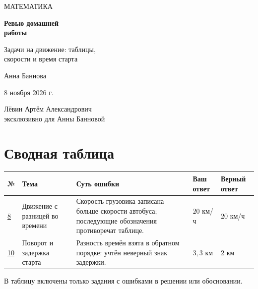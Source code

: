 \documentclass[a4paper,12pt]{article}
\begin{document}
\begin{titlepage}
\centering
\vspace*{21mm}
{\large\color{muted} МАТЕМАТИКА\par}
\vspace{20mm}
{\Huge\bfseries\color{ink} Ревью домашней\\[5pt] работы\par}
\vspace{12mm}
{\large Задачи на движение: таблицы,\\ скорости и время старта\par}
\vspace{19mm}
{\Large Анна Баннова\par}
\vspace{8mm}
{\large 8 ноября 2026 г.\par}
\vfill
{\color{muted}\normalsize Лёвин Артём Александрович\\[4pt]
эксклюзивно для Анны Банновой\par}
\vspace{13mm}
\end{titlepage}

\section*{Сводная таблица}
\vspace{3mm}
\small
\begin{tabularx}{\linewidth}{@{}>{\raggedright\arraybackslash}p{13mm}>{\raggedright\arraybackslash}p{28mm}X>{\raggedright\arraybackslash}p{20mm}>{\raggedright\arraybackslash}p{21mm}@{}}
\toprule
\textbf{№} & \textbf{Тема} & \textbf{Суть ошибки} & \textbf{Ваш ответ} & \textbf{Верный ответ}\\
\midrule
\hyperref[task:8]{8} & Движение с разницей во времени & Скорость грузовика записана больше скорости автобуса; последующие обозначения противоречат таблице. & $20$ км/ч & $20$ км/ч\\
\addlinespace[1mm]
\hyperref[task:10]{10} & Поворот и задержка старта & Разность времён взята в обратном порядке: учтён неверный знак задержки. & $3{,}3$ км & $2$ км\\
\bottomrule
\end{tabularx}
\normalsize
\vspace{7mm}
{\small\color{muted} В таблицу включены только задания с ошибками в решении или обосновании.}
\end{document}
